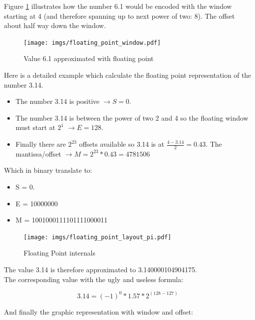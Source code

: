 \documentclass[book.tex]{subfiles}
\begin{document}
Figure \ref{fig:fp_internals_window} illustrates how the number 6.1 would be encoded with the window starting at 4 (and therefore spanning up to next power of two: 8). The offset about half way down the window.

\begin{figure}[H]
\centering
\texttt{[image: imgs/floating\_point\_window.pdf]}

\caption{Value 6.1 approximated with floating point}
\label{fig:fp_internals_window}
\end{figure}
  \bigskip
  
Here is a detailed example which calculate the floating point representation of the number 3.14.
\begin{itemize}
 \item The number 3.14 is positive  $\rightarrow S=0$.
 \item The number 3.14 is between the power of two 2 and 4 so the floating window must start at $2^1$  $\rightarrow E=128$.
 \item Finally there are $2^{23}$ offsets available so 3.14 is at $\frac{4-3.14}{2} = 0.43 $. The mantissa/offset $\rightarrow M = 2^{23}*0.43 = 4781506$
\end{itemize}

Which in binary translate to:

\begin{itemize}
\item S = 0.
\item E = 10000000
\item M = 1001000111101111000011
\end{itemize}

\begin{figure}[H]
\centering
\texttt{[image: imgs/floating\_point\_layout\_pi.pdf]}
\caption{Floating Point internals}
\label{fig:fp_internals}
\end{figure}
  \bigskip

The value 3.14 is therefore approximated to 3.140000104904175.\\

The corresponding value with the ugly and useless formula:

\begin{equation}
3.14 = (-1)^0 * 1.57 * 2^{(128-127)}
\end{equation}

\bigskip

And finally the graphic representation with window and offset:\\
\end{document}
